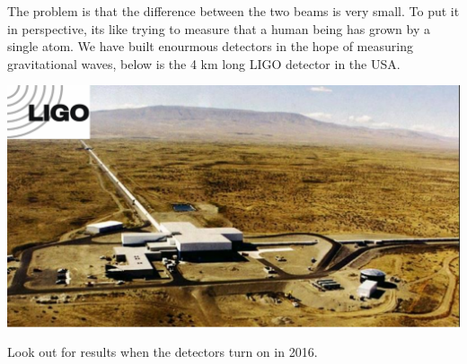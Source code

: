\documentclass[20pt, a1paper, portrait, margin=0mm, innermargin=10mm,
    titleinnersep=8mm,titletoblockverticalspace=0mm,blocktitleinnersep=8mm,
    blocktitlewidthratio=08, blocktitlemaxwidth=25cm ,blockbodyinnersep=8mm,
    blockverticalspace=10mm,colspace=5mm, subcolspace=0mm,noteinnersep=3mm]
    {tikzposter}
\begin{document}
{\begin{minipage}[t]{0.49\linewidth}
The problem is that the difference between the two beams is very
small.  To put it in perspective, its like trying to measure that a human being
has grown by a single atom. We have built enourmous detectors in the hope of 
measuring gravitational waves, below is the 4 km long LIGO detector in the USA.
\begin{tikzfigure}
   \vspace{-8mm}
\centering
\includegraphics[width=0.9\linewidth]{img/Hanford1_with_logo}
\end{tikzfigure}
\centerline{\Large Look out for results when the detectors turn on in 2016. }


\end{minipage}
}
\end{document}

